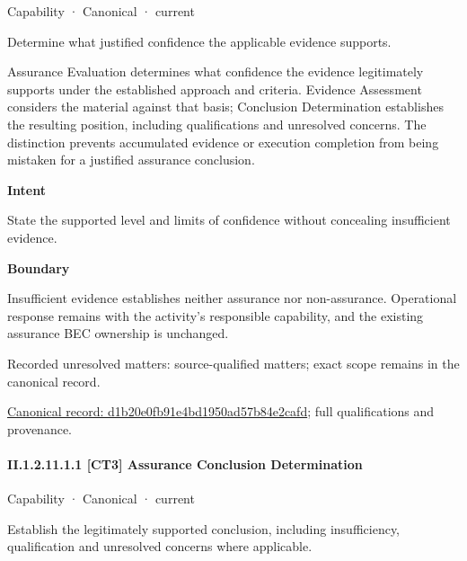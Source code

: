\label{element:d1b20e0fb91e4bd1950ad57b84e2cafd}
{\small Capability · Canonical · current}\par

Determine what justified confidence the applicable evidence supports.



Assurance Evaluation determines what confidence the evidence legitimately supports under the established approach and criteria. Evidence Assessment considers the material against that basis; Conclusion Determination establishes the resulting position, including qualifications and unresolved concerns. The distinction prevents accumulated evidence or execution completion from being mistaken for a justified assurance conclusion.



\textbf{Intent}



State the supported level and limits of confidence without concealing insufficient evidence.



\textbf{Boundary}



Insufficient evidence establishes neither assurance nor non-assurance. Operational response remains with the activity's responsible capability, and the existing assurance BEC ownership is unchanged.


{\small Recorded unresolved matters: source-qualified matters; exact scope remains in the canonical record.}\par
{\footnotesize \href{../../../../../../../continuum/strategy/capability/d1b20e0fb91e4bd1950ad57b84e2cafd.md}{Canonical record: d1b20e0fb91e4bd1950ad57b84e2cafd}; full qualifications and provenance.}\par
\paragraph*{II.1.2.11.1.1 [CT3] Assurance Conclusion Determination}
\label{navigation:II.1.2.11.1.1}

\label{element:10f538feae4042829fafeae472882128}
{\small Capability · Canonical · current}\par

Establish the legitimately supported conclusion, including insufficiency, qualification and unresolved concerns where applicable.



